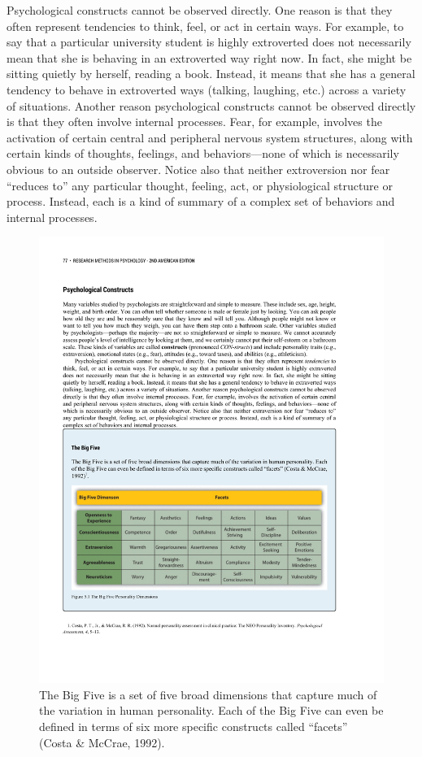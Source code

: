 \documentclass[]{book}
\theoremstyle{definition}
\theoremstyle{definition}
\theoremstyle{remark}
\begin{document}
Psychological constructs cannot be observed directly. One reason is that
they often represent tendencies to think, feel, or act in certain ways.
For example, to say that a particular university student is highly
extroverted does not necessarily mean that she is behaving in an
extroverted way right now. In fact, she might be sitting quietly by
herself, reading a book. Instead, it means that she has a general
tendency to behave in extroverted ways (talking, laughing, etc.) across
a variety of situations. Another reason psychological constructs cannot
be observed directly is that they often involve internal processes.
Fear, for example, involves the activation of certain central and
peripheral nervous system structures, along with certain kinds of
thoughts, feelings, and behaviors---none of which is necessarily obvious
to an outside observer. Notice also that neither extroversion nor fear
``reduces to'' any particular thought, feeling, act, or physiological
structure or process. Instead, each is a kind of summary of a complex
set of behaviors and internal processes.

\begin{figure}[htbp]
\centering
\includegraphics{figures/C5bigfive.pdf}
\caption{The Big Five is a set of five broad dimensions that capture
much of the variation in human personality. Each of the Big Five can
even be defined in terms of six more specific constructs called
``facets'' (Costa \& McCrae, 1992).}
\end{figure}
\end{document}
